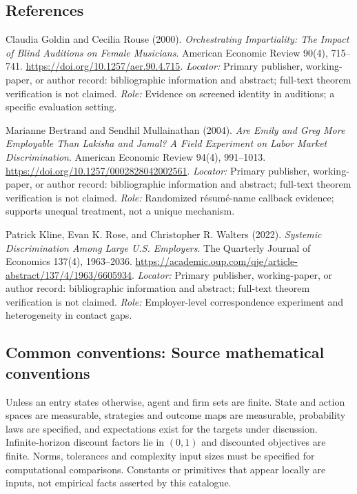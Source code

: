 \documentclass[11pt,a4paper]{article}
\begin{document}
\subsection*{References}
\begin{enumerate}[label=\textnormal{[S\arabic*]},leftmargin=*]
\item Claudia Goldin and Cecilia Rouse (2000). \emph{Orchestrating Impartiality: The Impact of Blind Auditions on Female Musicians}. American Economic Review 90(4), 715--741. \url{https://doi.org/10.1257/aer.90.4.715}. \textit{Locator:} Primary publisher, working-paper, or author record: bibliographic information and abstract; full-text theorem verification is not claimed. \textit{Role:} Evidence on screened identity in auditions; a specific evaluation setting.
\item Marianne Bertrand and Sendhil Mullainathan (2004). \emph{Are Emily and Greg More Employable Than Lakisha and Jamal? A Field Experiment on Labor Market Discrimination}. American Economic Review 94(4), 991--1013. \url{https://doi.org/10.1257/0002828042002561}. \textit{Locator:} Primary publisher, working-paper, or author record: bibliographic information and abstract; full-text theorem verification is not claimed. \textit{Role:} Randomized résumé-name callback evidence; supports unequal treatment, not a unique mechanism.
\item Patrick Kline, Evan K. Rose, and Christopher R. Walters (2022). \emph{Systemic Discrimination Among Large U.S. Employers}. The Quarterly Journal of Economics 137(4), 1963--2036. \url{https://academic.oup.com/qje/article-abstract/137/4/1963/6605934}. \textit{Locator:} Primary publisher, working-paper, or author record: bibliographic information and abstract; full-text theorem verification is not claimed. \textit{Role:} Employer-level correspondence experiment and heterogeneity in contact gaps.
\end{enumerate}

\subsection*{Common conventions: Source mathematical conventions}

Unless an entry states otherwise, agent and firm sets are finite. State and action spaces are measurable, strategies and outcome maps are measurable, probability laws are specified, and expectations exist for the targets under discussion. Infinite-horizon discount factors lie in $(0,1)$ and discounted objectives are finite. Norms, tolerances and complexity input sizes must be specified for computational comparisons. Constants or primitives that appear locally are inputs, not empirical facts asserted by this catalogue.
\end{document}
